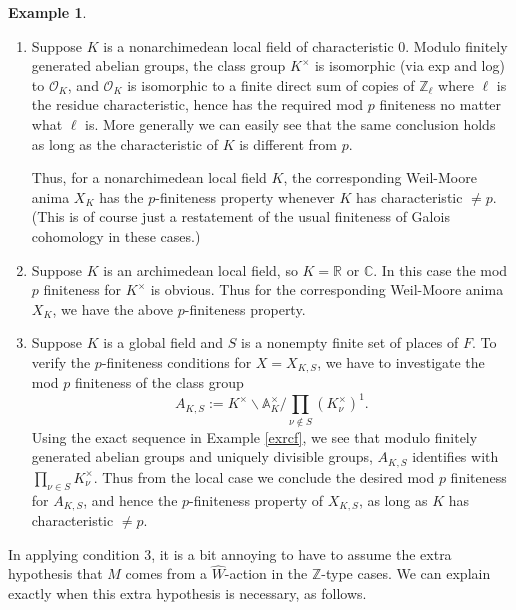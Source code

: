 \documentclass[12pt]{article}
\theoremstyle{definition}
\newtheorem{example}[theorem]{Example}
\newcommand{\mc}{\mathcal}
\newcommand{\mbb}{\mathbb}
\newcommand{\wh}{\widehat}
\begin{document}
\begin{example}

\begin{enumerate}
\item Suppose $K$ is a nonarchimedean local field of characteristic $0$.  Modulo finitely generated abelian groups, the class group $K^\times$ is isomorphic (via exp and log) to $\mc{O}_K$, and $\mc{O}_K$ is isomorphic to a finite direct sum of copies of $\mbb{Z}_\ell$ where $\ell$ is the residue characteristic, hence has the required mod $p$ finiteness no matter what $\ell$ is.  More generally we can easily see that the same conclusion holds as long as the characteristic of $K$ is different from $p$.  

Thus, for a nonarchimedean local field $K$, the corresponding Weil-Moore anima $X_K$ has the $p$-finiteness property whenever $K$ has characteristic $\neq p$.  (This is of course just a restatement of the usual finiteness of Galois cohomology in these cases.)
\item Suppose $K$ is an archimedean local field, so $K=\mbb{R}$ or $\mbb{C}$.  In this case the mod $p$ finiteness for $K^\times$ is obvious.  Thus for the corresponding Weil-Moore anima $X_K$, we have the above $p$-finiteness property.
\item Suppose $K$ is a global field and $S$ is a nonempty finite set of places of $F$.  To verify the $p$-finiteness conditions for $X=X_{K,S}$, we have to investigate the mod $p$ finiteness of the class group
$$A_{K,S}:= K^\times\backslash \mathbb{A}_K^\times/\prod_{\nu\not\in S} (K_\nu^\times)^1.$$
Using the exact sequence in Example \ref{exrcf}, we see that modulo finitely generated abelian groups and uniquely divisible groups, $A_{K,S}$ identifies with $\prod_{\nu\in S}K^\times_\nu$. Thus from the local case we conclude the desired mod $p$ finiteness for $A_{K,S}$, and hence the $p$-finiteness property of $X_{K,S}$, as long as $K$ has characteristic $\neq p$.
\end{enumerate}
\end{example}

In applying condition 3, it is a bit annoying to have to assume the extra hypothesis that $M$ comes from a $\wh{W}$-action in the $\mbb{Z}$-type cases.  We can explain exactly when this extra hypothesis is necessary, as follows.
\end{document}
